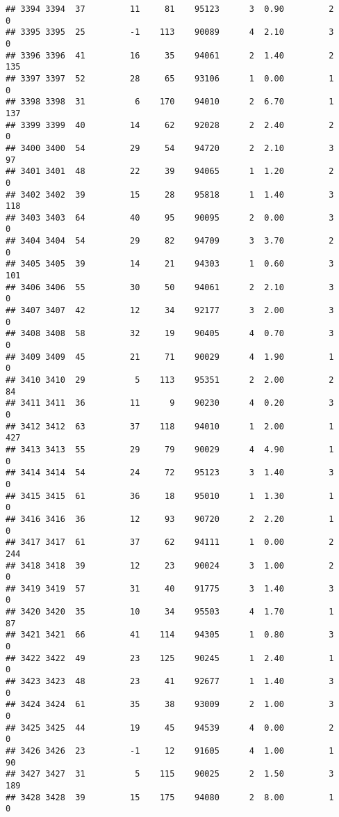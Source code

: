 \documentclass[
]{article}
\begin{document}
\begin{verbatim}
## 3394 3394  37         11     81    95123      3  0.90         2        0
## 3395 3395  25         -1    113    90089      4  2.10         3        0
## 3396 3396  41         16     35    94061      2  1.40         2      135
## 3397 3397  52         28     65    93106      1  0.00         1        0
## 3398 3398  31          6    170    94010      2  6.70         1      137
## 3399 3399  40         14     62    92028      2  2.40         2        0
## 3400 3400  54         29     54    94720      2  2.10         3       97
## 3401 3401  48         22     39    94065      1  1.20         2        0
## 3402 3402  39         15     28    95818      1  1.40         3      118
## 3403 3403  64         40     95    90095      2  0.00         3        0
## 3404 3404  54         29     82    94709      3  3.70         2        0
## 3405 3405  39         14     21    94303      1  0.60         3      101
## 3406 3406  55         30     50    94061      2  2.10         3        0
## 3407 3407  42         12     34    92177      3  2.00         3        0
## 3408 3408  58         32     19    90405      4  0.70         3        0
## 3409 3409  45         21     71    90029      4  1.90         1        0
## 3410 3410  29          5    113    95351      2  2.00         2       84
## 3411 3411  36         11      9    90230      4  0.20         3        0
## 3412 3412  63         37    118    94010      1  2.00         1      427
## 3413 3413  55         29     79    90029      4  4.90         1        0
## 3414 3414  54         24     72    95123      3  1.40         3        0
## 3415 3415  61         36     18    95010      1  1.30         1        0
## 3416 3416  36         12     93    90720      2  2.20         1        0
## 3417 3417  61         37     62    94111      1  0.00         2      244
## 3418 3418  39         12     23    90024      3  1.00         2        0
## 3419 3419  57         31     40    91775      3  1.40         3        0
## 3420 3420  35         10     34    95503      4  1.70         1       87
## 3421 3421  66         41    114    94305      1  0.80         3        0
## 3422 3422  49         23    125    90245      1  2.40         1        0
## 3423 3423  48         23     41    92677      1  1.40         3        0
## 3424 3424  61         35     38    93009      2  1.00         3        0
## 3425 3425  44         19     45    94539      4  0.00         2        0
## 3426 3426  23         -1     12    91605      4  1.00         1       90
## 3427 3427  31          5    115    90025      2  1.50         3      189
## 3428 3428  39         15    175    94080      2  8.00         1        0

\end{verbatim}
\end{document}
